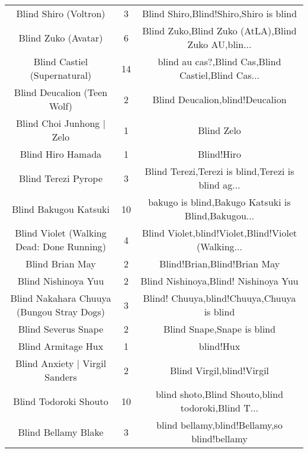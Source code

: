 \begin{table}[h!]
{\begin{tabular}{|c|c|c|}
                             Blind Shiro (Voltron) &      3 &             Blind Shiro,Blind!Shiro,Shiro is blind \\
                               Blind Zuko (Avatar) &      6 & Blind Zuko,Blind Zuko (AtLA),Blind Zuko AU,blin... \\
                      Blind Castiel (Supernatural) &     14 & blind au cas?,Blind Cas,Blind Castiel,Blind Cas... \\
                       Blind Deucalion (Teen Wolf) &      2 &                    Blind Deucalion,blind!Deucalion \\
                         Blind Choi Junhong | Zelo &      1 &                                         Blind Zelo \\
                                 Blind Hiro Hamada &      1 &                                         Blind!Hiro \\
                               Blind Terezi Pyrope &      3 & Blind Terezi,Terezi is blind,Terezi is blind ag... \\
                             Blind Bakugou Katsuki &     10 & bakugo is blind,Bakugo Katsuki is Blind,Bakugou... \\
         Blind Violet (Walking Dead: Done Running) &      4 & Blind Violet,blind!Violet,Blind!Violet (Walking... \\
                                   Blind Brian May &      2 &                        Blind!Brian,Blind!Brian May \\
                               Blind Nishinoya Yuu &      2 &               Blind Nishinoya,Blind! Nishinoya Yuu \\
         Blind Nakahara Chuuya (Bungou Stray Dogs) &      3 &         Blind! Chuuya,blind!Chuuya,Chuuya is blind \\
                               Blind Severus Snape &      2 &                         Blind Snape,Snape is blind \\
                                Blind Armitage Hux &      1 &                                          blind!Hux \\
                    Blind Anxiety | Virgil Sanders &      2 &                          Blind Virgil,blind!Virgil \\
                             Blind Todoroki Shouto &     10 & blind shoto,Blind Shouto,blind todoroki,Blind T... \\
                               Blind Bellamy Blake &      3 &       blind bellamy,blind!Bellamy,so blind!bellamy \\

\end{tabular}}
\end{table}

